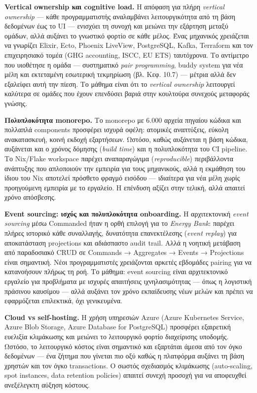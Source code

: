 \textbf{Vertical ownership και cognitive load.} Η απόφαση για πλήρη
\emph{vertical ownership} --- κάθε προγραμματιστής αναλαμβάνει
λειτουργικότητα από τη βάση δεδομένων έως το UI --- ενισχύει τη συνοχή
και μειώνει την εξάρτηση μεταξύ ομάδων, αλλά αυξάνει το γνωστικό φορτίο
σε κάθε μέλος. Ένας μηχανικός χρειάζεται να γνωρίζει Elixir, Ecto,
Phoenix LiveView, PostgreSQL, Kafka, Terraform και τον επιχειρησιακό
τομέα (GHG accounting, ISCC, EU ETS) ταυτόχρονα. Το αντίμετρο που
υιοθέτησε η ομάδα --- συστηματικό \emph{pair programming}, buddy system
για νέα μέλη και εκτεταμένη εσωτερική τεκμηρίωση (βλ. Κεφ. 10.7) ---
μέτρια αλλά δεν εξαλείφει αυτή την πίεση. Το μάθημα είναι ότι το
\emph{vertical ownership} λειτουργεί καλύτερα σε ομάδες που έχουν
επενδύσει βαριά στην κουλτούρα συνεχούς μεταφοράς γνώσης.

\textbf{Πολυπλοκότητα monorepo.} Το monorepo με 6.000 αρχεία πηγαίου
κώδικα και πολλαπλά components προσφέρει ισχυρά οφέλη: ατομικές
αναπτύξεις, εύκολη ανακατασκευή, κοινή εκδοχή εξαρτήσεων. Ωστόσο, καθώς
αυξάνεται η βάση κώδικα, αυξάνεται και ο χρόνος δόμησης (\emph{build
time}) και η πολυπλοκότητα του CI pipeline. Το Nix/Flake workspace
παρέχει αναπαραγώγιμα (\emph{reproducible}) περιβάλλοντα ανάπτυξης που
απλοποιούν την εμπειρία για τους μηχανικούς, αλλά η εκμάθηση του ίδιου
του Nix αποτελεί πρόσθετο φραγμό εισόδου --- ιδιαίτερα για νέα μέλη
χωρίς προηγούμενη εμπειρία με το εργαλείο. Η επένδυση αξίζει στην
τελική, αλλά απαιτεί χρόνο απόσβεσης.

\textbf{Event sourcing: ισχύς και πολυπλοκότητα onboarding.} Η
αρχιτεκτονική \emph{event sourcing} μέσω Commanded ήταν η ορθή επιλογή
για το \emph{Energy Bank}: παρέχει πλήρες ιστορικό κάθε συναλλαγής,
δυνατότητα επανεκτέλεσης (\emph{event replay}) για αποκατάσταση
projections και αδιάσπαστο audit trail. Αλλά η νοητική μετάβαση από
παραδοσιακό CRUD σε Commands → Aggregates → Events → Projections είναι
σημαντική. Νέοι προγραμματιστές χρειάζονται αρκετές εβδομάδες pairing
για να κατανοήσουν πλήρως τη ροή. Το μάθημα: event sourcing είναι
αρχιτεκτονικό εργαλείο για προβλήματα με ισχυρές απαιτήσεις
ιχνηλασιμότητας --- όπως η λογιστική πράσινου καυσίμου --- αλλά αυξάνει
τον χρόνο εκπαίδευσης νέων μελών και πρέπει να εφαρμόζεται επιλεκτικά,
όχι γενικευμένα.

\textbf{Cloud vs self-hosting.} Η χρήση υπηρεσιών Azure (Azure
Kubernetes Service, Azure Blob Storage, Azure Database for PostgreSQL)
προσφέρει εξαιρετική ευελιξία κλιμάκωσης και μειώνει το λειτουργικό
φορτίο διαχείρισης υποδομής. Ωστόσο, το λειτουργικό κόστος είναι
σημαντικό και εξαρτάται άμεσα από τον όγκο δεδομένων --- ένα ζήτημα που
γίνεται πιο οξύ καθώς η πλατφόρμα αυξάνει τη βάση χρηστών και τον όγκο
transactions. Ο σωστός σχεδιασμός κλιμάκωσης (auto-scaling, spot
instances, data retention policies) απαιτεί συνεχή προσοχή για να
αποφευχθεί ανεξέλεγκτη αύξηση κόστους.

